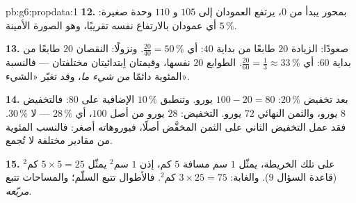 \begin{solution}{pb:g6:propdata:1}
\textbf{12.} بمحور يبدأ من $0$، يرتفع العمودان إلى $105$ و
$110$ وحدة صغيرة: أي عمودان بالارتفاع نفسه تقريبًا، وهو
الصورة الأمينة  $5\,\%$.

\textbf{13.} صعودًا: الزيادة $20$ طابعًا من بداية
$40$: أي $\frac{20}{40} = 50\,\%$. ونزولًا: النقصان $20$
طابعًا من بداية $60$: أي $\frac{20}{60} = \frac13 \approx
33\,\%$. الطوابع $20$ نفسها، وقيمتان اِبتدائيتان مختلفتان --- فالنسبة
المئوية دائمًا  \emph{من شيء ما}، وقد تغيّر
«الشيء».

\textbf{14.} بعد تخفيض $20\,\%$: $100 - 20 = 80$ يورو.
وتنطبق $10\,\%$ الإضافية على $80$: فالتخفيض $8$ يورو، والثمن النهائي
$72$ يورو.  التخفيض: $28$ يورو من أصل $100$، أي
$28\,\%$ --- لا $30\,\%$. فقد عمل التخفيض الثاني على
الثمن المخفَّض أصلًا، فيوروهاته أصغر: فالنسب المئوية من
مقادير مختلفة لا تُجمع.

\textbf{15.} على تلك الخريطة، يمثّل $1$ سم مسافة $5$ كم، إذن $1$
سم$^2$ يمثّل $5 \times 5 = 25$ كم$^2$ (قاعدة السؤال 9).
والغابة: $3 \times 25 = 75$ كم$^2$. فالأطوال تتبع
السلّم؛ والمساحات تتبع \emph{مربّعه}.
\end{solution}
